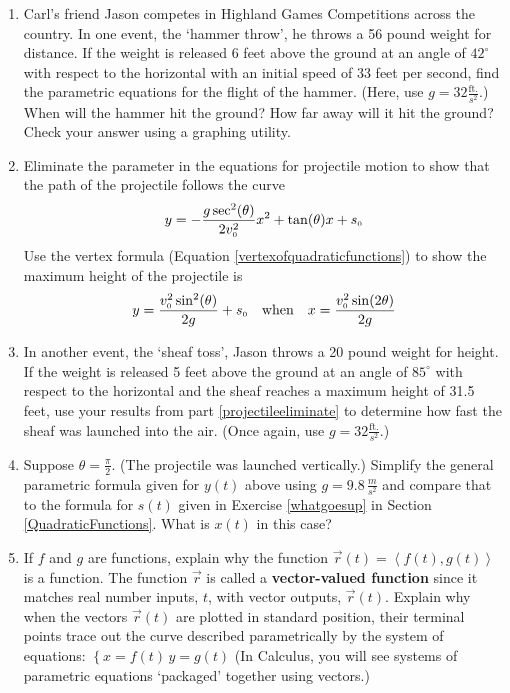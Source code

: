 \begin{enumerate}
\setcounter{enumi}{\value{HW}}

\item  Carl's friend Jason competes in Highland Games Competitions across the country.  In one event, the `hammer throw',  he throws a 56 pound weight for distance. If the weight is released $6$ feet above the ground at an angle of $42^{\circ}$ with respect to the horizontal with an initial speed of $33$ feet per second, find the parametric equations for the flight of the hammer.  (Here, use $g = 32 \frac{\text{ft.}}{s^2}$.) When will the hammer hit the ground?  How far away will it hit the ground? Check your answer using a graphing utility.

\item  \label{projectileeliminate} Eliminate the parameter in the equations for projectile motion to show that the path of the projectile follows the curve \[y = -\dfrac{g \sec^{2}(\theta)}{2 v_{\text{\tiny$0$}}^2} x^2 + \tan(\theta) x + s_{\text{\tiny $0$}}\] Use the vertex formula (Equation \ref{vertexofquadraticfunctions}) to show the maximum height of the projectile is \[y = \dfrac{v_{\text{\tiny$0$}}^2 \sin^{2}(\theta)}{2g} + s_{\text{\tiny $0$}} \quad \text{when} \quad x = \dfrac{v_{\text{\tiny$0$}}^2 \sin(2\theta) }{2g}\] 

\item  In another event, the `sheaf toss', Jason throws a  20 pound weight for height.  If the weight is released  5 feet above the ground at an angle of $85^{\circ}$ with respect to the horizontal and the sheaf reaches a maximum height of 31.5 feet, use your results from part  \ref{projectileeliminate} to determine how fast the sheaf was launched into the air.  (Once again, use $g = 32 \frac{\text{ft.}}{s^2}$.)

\item  Suppose $\theta = \frac{\pi}{2}$. (The projectile was launched vertically.) Simplify the general parametric formula given for $y(t)$ above using  $g = 9.8 \, \frac{m}{s^2}$ and compare that to the formula for $s(t)$ given in Exercise \ref{whatgoesup} in Section \ref{QuadraticFunctions}.  What is $x(t)$ in this case?

\item  If $f$ and $g$ are functions, explain why the function $\vec{r}(t) = \left<f(t), g(t) \right>$ is a function. The function $\vec{r}$ is called a \textbf{vector-valued function} since it matches real number inputs, $t$, with vector outputs, $\vec{r}(t)$.   Explain why when the vectors  $\vec{r}(t)$ are plotted in standard position, their terminal points trace out the curve described parametrically by the system of equations:  $\left\{ x = f(t) \, y =  g(t) \right.$  (In Calculus, you will see  systems of parametric equations `packaged' together using vectors.)

\setcounter{HW}{\value{enumi}}
\end{enumerate}



